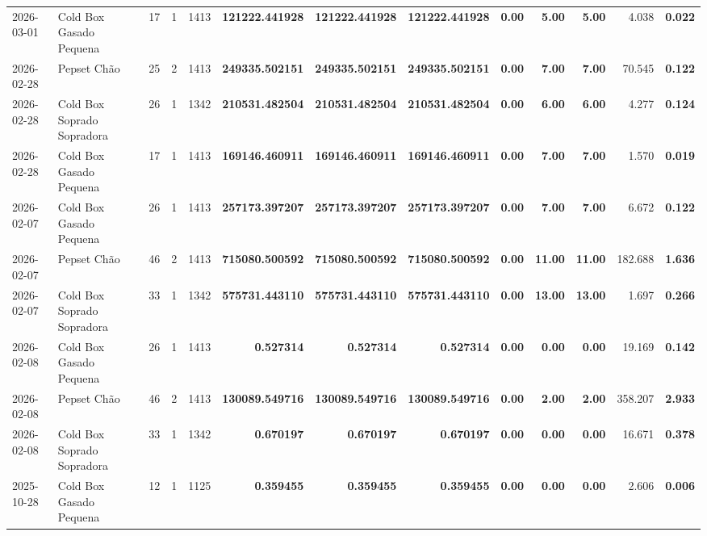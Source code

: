 {\begin{center}
{\begin{tabular}{@{}llrrrrrrrrrrr@{}}
2026-03-01 & Cold Box Gasado Pequena & 17 & 1 & 1413 & \textbf{121222.441928} & \textbf{121222.441928} & \textbf{121222.441928} & \textbf{0.00} & \textbf{5.00} & \textbf{5.00} & 4.038 & \textbf{0.022} \\
2026-02-28 & Pepset Chão & 25 & 2 & 1413 & \textbf{249335.502151} & \textbf{249335.502151} & \textbf{249335.502151} & \textbf{0.00} & \textbf{7.00} & \textbf{7.00} & 70.545 & \textbf{0.122} \\
2026-02-28 & Cold Box Soprado Sopradora & 26 & 1 & 1342 & \textbf{210531.482504} & \textbf{210531.482504} & \textbf{210531.482504} & \textbf{0.00} & \textbf{6.00} & \textbf{6.00} & 4.277 & \textbf{0.124} \\
2026-02-28 & Cold Box Gasado Pequena & 17 & 1 & 1413 & \textbf{169146.460911} & \textbf{169146.460911} & \textbf{169146.460911} & \textbf{0.00} & \textbf{7.00} & \textbf{7.00} & 1.570 & \textbf{0.019} \\
2026-02-07 & Cold Box Gasado Pequena & 26 & 1 & 1413 & \textbf{257173.397207} & \textbf{257173.397207} & \textbf{257173.397207} & \textbf{0.00} & \textbf{7.00} & \textbf{7.00} & 6.672 & \textbf{0.122} \\
2026-02-07 & Pepset Chão & 46 & 2 & 1413 & \textbf{715080.500592} & \textbf{715080.500592} & \textbf{715080.500592} & \textbf{0.00} & \textbf{11.00} & \textbf{11.00} & 182.688 & \textbf{1.636} \\
2026-02-07 & Cold Box Soprado Sopradora & 33 & 1 & 1342 & \textbf{575731.443110} & \textbf{575731.443110} & \textbf{575731.443110} & \textbf{0.00} & \textbf{13.00} & \textbf{13.00} & 1.697 & \textbf{0.266} \\
2026-02-08 & Cold Box Gasado Pequena & 26 & 1 & 1413 & \textbf{0.527314} & \textbf{0.527314} & \textbf{0.527314} & \textbf{0.00} & \textbf{0.00} & \textbf{0.00} & 19.169 & \textbf{0.142} \\
2026-02-08 & Pepset Chão & 46 & 2 & 1413 & \textbf{130089.549716} & \textbf{130089.549716} & \textbf{130089.549716} & \textbf{0.00} & \textbf{2.00} & \textbf{2.00} & 358.207 & \textbf{2.933} \\
2026-02-08 & Cold Box Soprado Sopradora & 33 & 1 & 1342 & \textbf{0.670197} & \textbf{0.670197} & \textbf{0.670197} & \textbf{0.00} & \textbf{0.00} & \textbf{0.00} & 16.671 & \textbf{0.378} \\
2025-10-28 & Cold Box Gasado Pequena & 12 & 1 & 1125 & \textbf{0.359455} & \textbf{0.359455} & \textbf{0.359455} & \textbf{0.00} & \textbf{0.00} & \textbf{0.00} & 2.606 & \textbf{0.006} \\

\end{tabular}}
\end{center}}

